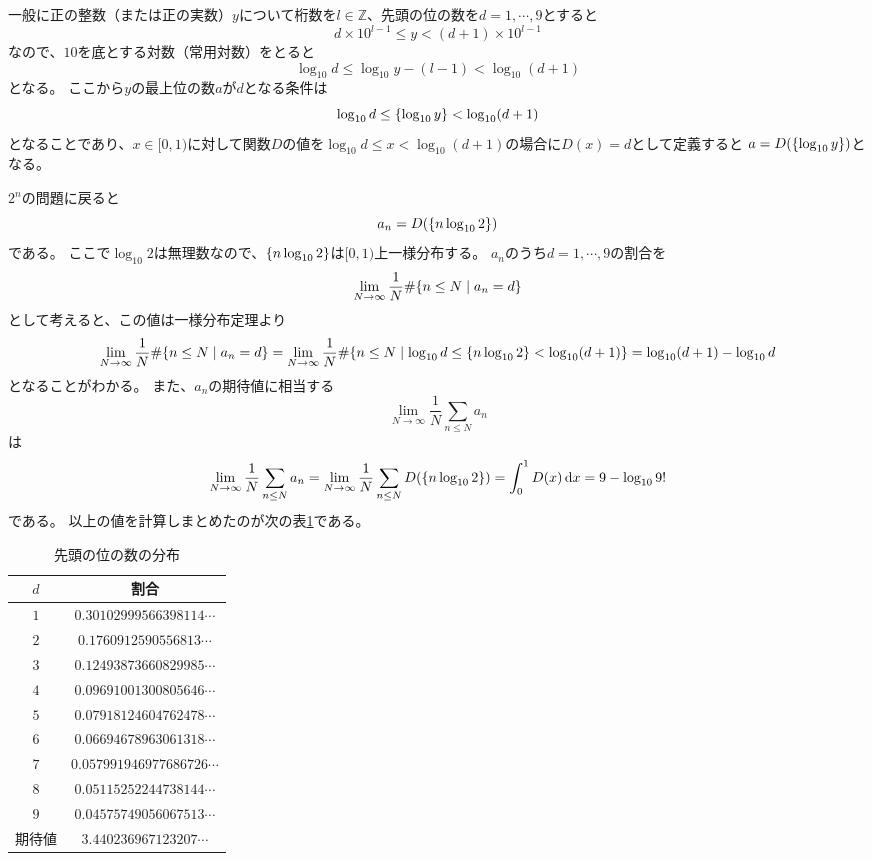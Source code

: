 一般に正の整数（または正の実数）$y$について桁数を$l \in \mathbb{Z}$、先頭の位の数を$d = 1, \cdots, 9$とすると
$$
d\times 10^{l-1} \le y < (d+1)\times 10^{l-1}
$$
なので、$10$を底とする対数（常用対数）をとると
$$
\log_{10}d \le \log_{10}y-(l-1) < \log_{10}(d+1)
$$
となる。
ここから$y$の最上位の数$a$が$d$となる条件は
$$
\log_{10}d \le \{\log_{10}y\} < \log_{10}(d+1)
$$
となることであり、$x \in [0, 1)$に対して関数$D$の値を$\log_{10}d \le x < \log_{10}(d+1)$の場合に$D(x) = d$として定義すると
$a = D(\{\log_{10}y\})$となる。

$2^n$の問題に戻ると
$$
a_n = D(\{n\log_{10}2\})
$$
である。
ここで$\log_{10}2$は無理数なので、$\{n\log_{10}2\}$は$[0, 1)$上一様分布する。
$a_n$のうち$d = 1, \cdots, 9$の割合を
$$
\lim_{N \to \infty}\frac{1}{N}\#\{ n \le N \mid a_n = d \}
$$
として考えると、この値は一様分布定理より
$$
\lim_{N \to \infty}\frac{1}{N}\#\{ n \le N \mid a_n = d \}
= \lim_{N \to \infty}\frac{1}{N}\#\{ n \le N \mid \log_{10}d \le \{n\log_{10}2\} < \log_{10}(d+1) \}
= \log_{10}(d+1)-\log_{10}d
$$
となることがわかる。
また、$a_n$の期待値に相当する
$$
\lim_{N \to \infty}\frac{1}{N}\sum_{n \le N}a_n
$$
は
$$
\lim_{N \to \infty}\frac{1}{N}\sum_{n \le N}a_n
= \lim_{N \to \infty}\frac{1}{N}\sum_{n \le N}D(\{n\log_{10}2\})
= \int_0^1 D(x)\dd{x}
= 9-\log_{10}9!
$$
である。
以上の値を計算しまとめたのが次の表\ref{f_benford_law}である。

\begin{table}[h]
\caption{先頭の位の数の分布}
\label{f_benford_law}
\centering
\begin{tabular}{cc}
\hline
$d$ & 割合 \\
\hline
$1$ & $0.30102999566398114\cdots$ \\
$2$ & $0.1760912590556813\cdots$ \\
$3$ & $0.12493873660829985\cdots$ \\
$4$ & $0.09691001300805646\cdots$ \\
$5$ & $0.07918124604762478\cdots$ \\
$6$ & $0.06694678963061318\cdots$ \\
$7$ & $0.057991946977686726\cdots$ \\
$8$ & $0.05115252244738144\cdots$ \\
$9$ & $0.04575749056067513\cdots$ \\
\hline
期待値 & $3.440236967123207\cdots$ \\
\hline
\end{tabular}
\end{table}

